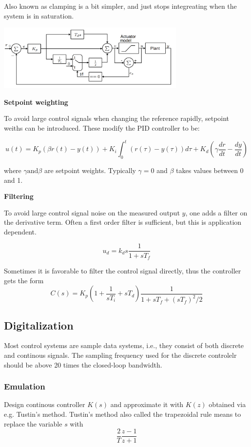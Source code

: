 Also known as clamping is a bit simpler, and just stops integreating when the system is in saturation.
\begin{center}
	\includegraphics[width=0.7\textwidth]{Images/conditional-integration.png}
\end{center}


\textbf{Setpoint weighting}

To avoid large control signals when changing the reference rapidly, setpoint weiths can be introduced.
These modify the PID controller to be:

$$ u(t) = K_p(\beta r(t) -y(t)) + K_i \int_0^t (r(\tau)-y(\tau))d\tau + K_d (\gamma \frac{dr}{dt} - \frac{dy}{dt})$$

where $\gamma \text{and} \beta$ are setpoint weights. Typically $\gamma = 0$ and $\beta$ takes values between
0 and 1.

\textbf{Filtering}

To avoid large control signal noise on the measured output $y$, one adds a filter
on the derivative term. Often a first order filter is sufficient, but this is application dependent.

$$ u_d = k_d s \frac{1}{1+sT_f}$$

Sometimes it is favorable to filter the control signal directly, thus the controller gets the form
$$ C(s) = K_p (1+\frac{1}{sT_i}+sT_d) \frac{1}{1+sT_f+(sT_f)^2/2}$$

\subsection{Digitalization}
Most control systems are sample data systems, i.e., they consist of both discrete and continous signals.
The sampling frequency used for the discrete controlelr should be above 20 times the closed-loop bandwidth.


\subsubsection{Emulation}
Design continous controller $K(s)$ and approximate it with $K(z)$ obtained via e.g. Tustin's method.
Tustin's method also called the trapezoidal rule means to replace the variable $s$ with $$\frac{2}{T} \frac{z-1}{z+1}$$



